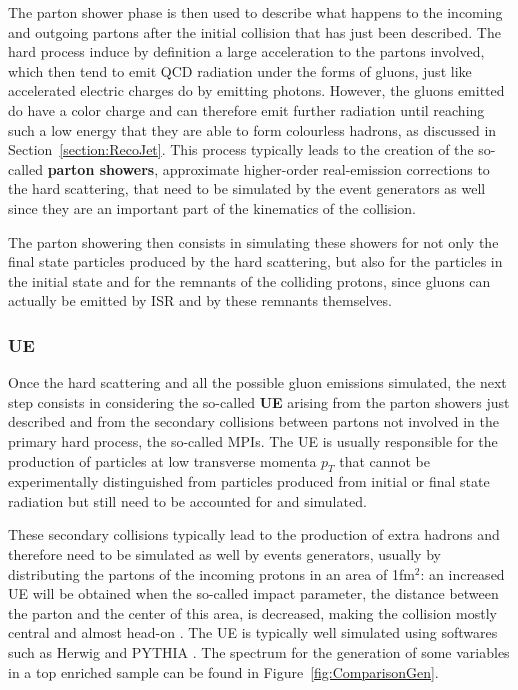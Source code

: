 \documentclass[a4paper, 10pt, openright]{report}
\begin{document}
The parton shower phase is then used to describe what happens to the incoming and outgoing partons after the initial collision that has just been described. The hard process induce by definition a large acceleration to the partons involved, which then tend to emit \ac{QCD} radiation under the forms of gluons, just like accelerated electric charges do by emitting photons. However, the gluons emitted do have a color charge and can therefore emit further radiation until reaching such a low energy that they are able to form colourless hadrons, as discussed in Section~\ref{section:RecoJet}. This process typically leads to the creation of the so-called \textbf{parton showers}, approximate higher-order real-emission corrections to the hard scattering, that need to be simulated by the event generators as well since they are an important part of the kinematics of the collision.

The parton showering then consists in simulating these showers for not only the final state particles produced by the hard scattering, but also for the particles in the initial state and for the remnants of the colliding protons, since gluons can actually be emitted by \acf{ISR} and by these remnants themselves.

\subsubsection*{\acf{UE}}

Once the hard scattering and all the possible gluon emissions simulated, the next step consists in considering the so-called \textbf{\acf{UE}} arising from the parton showers just described and from the secondary collisions between partons not involved in the primary hard process, the so-called \acp{MPI}. The \ac{UE} is usually responsible for the production of particles at low transverse momenta $p_T$ that cannot be experimentally distinguished from particles produced from initial or final state radiation but still need to be accounted for and simulated.

These secondary collisions typically lead to the production of extra hadrons and therefore need to be simulated as well by events generators, usually by distributing the partons of the incoming protons in an area of 1fm$^2$: an increased \ac{UE} will be obtained when the so-called impact parameter, the distance between the parton and the center of this area, is decreased, making the collision mostly central and almost head-on \cite{UE}. The \ac{UE} is typically well simulated using softwares such as Herwig \cite{Herwig} and PYTHIA \cite{PYTHIA}. The spectrum for the generation of some variables in a top enriched sample can be found in Figure~\ref{fig:ComparisonGen}.
\end{document}
